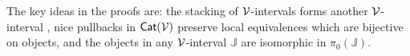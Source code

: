 \documentclass[a4paper,10pt
,draft
]{article}%
\newcommand{\I}{\mathbb I}
\newcommand{\J}{\mathbb J}
\renewcommand{\1}{\eta}%
\begin{document}
The key ideas in the proofs are:
the stacking of $\mathcal V$-intervals forms another $\mathcal V$-interval ,
nice pullbacks in $\mathsf{Cat}(\mathcal V)$ preserve local equivalences which are bijective on objects, and
the objects in any $\mathcal V$-interval $\mathbb J$ are isomorphic in $\pi_0(\mathbb J)$.

        
\end{document}

